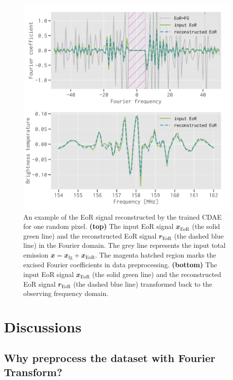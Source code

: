 \documentclass[fleqn,usenatbib]{mnras}
\newlength{\myfigwidth}
\newcommand{\R}[1]{\mathrm{#1}}
\newcommand{\B}[1]{\mathbfit{#1}}
\begin{document}
\begin{figure}
  \centering
  \includegraphics[width=\myfigwidth]{eor-result}
  \caption{\label{fig:result}%
    An example of the EoR signal reconstructed by the trained CDAE for
    one random pixel.
    \textbf{(top)} The input EoR signal $\B{x}_{\R{EoR}}$ (the solid
    green line) and the reconstructed EoR signal $\B{r}_{\R{EoR}}$
    (the dashed blue line) in the Fourier domain.
    The grey line represents the input total emission
    $\B{x} = \B{x}_{\R{fg}} + \B{x}_{\R{EoR}}$.
    The magenta hatched region marks the excised Fourier coefficients
    in data preprocessing.
    \textbf{(bottom)} The input EoR signal $\B{x}_{\R{EoR}}$ (the solid
    green line) and the reconstructed EoR signal $\B{r}_{\R{EoR}}$
    (the dashed blue line) transformed back to the observing frequency
    domain.
  }
\end{figure}


\section{Discussions}
\label{sec:discussions}

\subsection{Why preprocess the dataset with Fourier Transform?}
\label{sec:why-ft}
\end{document}
